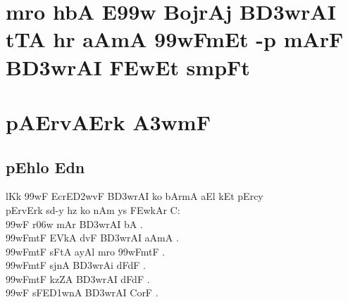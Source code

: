 \documentclass[12pt]{book}
\begin{document}
\frontmatter
%
\chapter*{\large {} }
\thispagestyle{empty}
\section*{\huge {}}
\newpage
%
\chapter*{\center \normalsize  {\dn m\?ro  h\0bA   E\399w BojrAj B\3D3wrAI tTA hr aAmA \399wFmEt -p mArF B\3D3wrAI \3FEwEt smpF{\qvb}t}}
%
%
\mainmatter
%
\chapter{ {\dn pAErvAErk \3A3wmF}}
\section{ {\dn pEhlo Edn }}
 {\dn l\?Kk \399wF EcrE\3D2wvF B\3D3wrAI ko bAr\?mA aEl kEt pErcy\\
pErvErk sd-y hz ko nAm ys \3FEwkAr C{\rs :\re} \\
\399wF  r\?\306w mAr B\3D3wrAI bA .\\
\399wFmtF EVkA d\?vF B\3D3wrAI aAmA . \\
\399wFmtF sFtA ayA\0l m\?ro \399wFmtF . \\
\399wFmtF sjnA B\3D3wrAi dFdF . \\
\399wFmtF kzZA B\3D3wrAI dFdF . \\
\399wF sFE\3D1wnA B\3D3wrAI CorF . \\
}
\end{document}
